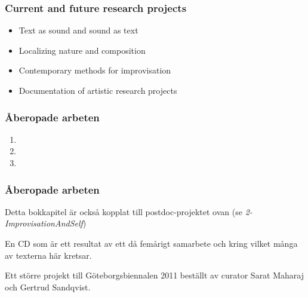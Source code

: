 \documentclass{beamer}
\begin{document}

\begin{frame}
\frametitle{Current and future research projects}

\begin{itemize}
\item Text as sound and sound as text
\item Localizing nature and composition
\item Contemporary methods for improvisation
\item Documentation of artistic research projects
\end{itemize}
\end{frame}


\begin{frame}
\frametitle{Åberopade arbeten}
  \begin{enumerate}
  \item {}
  \item {}
  \item {}
  \end{enumerate}


\end{frame}


\begin{frame}
\frametitle{Åberopade arbeten}

Detta bokkapitel är också kopplat till postdoc-projektet ovan (se \emph{2-ImprovisationAndSelf})

\vspace{0.4cm}


En CD som är ett resultat av ett då femårigt samarbete och kring vilket många av texterna här kretsar.

\vspace{0.4cm}


Ett större projekt till Göteborgsbiennalen 2011 beställt av curator Sarat Maharaj och Gertrud Sandqvist. 

\end{frame}
\end{document}
